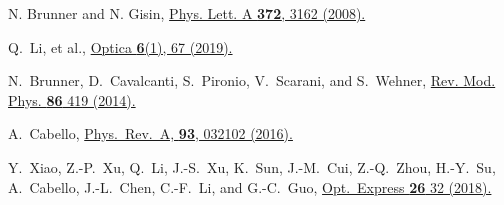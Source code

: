 \documentclass[pra,aps,notitlepage,superscriptaddress,showpacs,showkeys]{revtex4-1}
\theoremstyle{definition}
\theoremstyle{remark}
\begin{document}
\begin{thebibliography}{99}

 N. Brunner and N. Gisin,
 \href{http://dx.doi.org/10.1016/j.physleta.2008.01.052}{Phys. Lett. A \textbf{372}, 3162 (2008).}


 Q.~Li, et al.,
 \href{https://doi.org/10.1364/OPTICA.6.000067}{Optica \textbf{6}(1), 67 (2019).}

 N.~Brunner, D.~Cavalcanti, S.~Pironio, V.~Scarani, and S.~Wehner,
 \href{https://doi.org/10.1103/RevModPhys.86.419}{Rev. Mod. Phys. \textbf{86} 419 (2014).}


 A.~Cabello,
 \href{https://doi.org/10.1103/PhysRevA.93.032102}{Phys.~Rev.~A, \textbf{93}, 032102 (2016).}

 Y.~Xiao, Z.-P.~Xu, Q.~Li, J.-S.~Xu, K.~Sun, J.-M.~Cui, Z.-Q.~Zhou, H.-Y.~Su, A.~Cabello, J.-L.~Chen, C.-F.~Li, and G.-C.~Guo,
 \href{https://doi.org/10.1364/OE.26.000032}{Opt.~Express \textbf{26} 32 (2018).}


\end{thebibliography}
\end{document}
